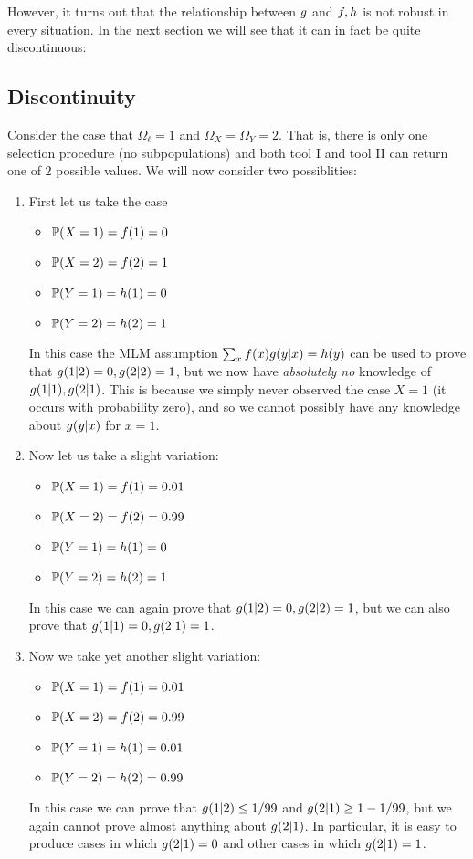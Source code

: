 However, it turns out that the relationship between $g$ and $f,h$ is not robust in every situation.  In the next section we will see that it can in fact be quite discontinuous:

\subsection{Discontinuity}

Consider the case that $\Omega_\ell = 1$ and $\Omega_X=\Omega_Y=2$.  That is, there is only one selection procedure (no subpopulations) and both tool I and tool II can return one of $2$ possible values.  We will now consider two possiblities:
\begin{enumerate}
\item First let us take the case
    \begin{itemize}
    \item $\mathbb{P}(X=1)=f(1)=0$
    \item $\mathbb{P}(X=2)=f(2)=1$
    \item $\mathbb{P}(Y=1)=h(1)=0$
    \item $\mathbb{P}(Y=2)=h(2)=1$
    \end{itemize}
    In this case the MLM assumption $\sum_x f(x)g(y|x)=h(y)$ can be used to prove that $g(1|2)=0,g(2|2)=1$, but we now have \emph{absolutely no} knowledge of $g(1|1),g(2|1)$.  This is because we simply never observed the case $X=1$ (it occurs with probability zero), and so we cannot possibly have any knowledge about $g(y|x)$ for $x=1$.  
\item Now let us take a slight variation:
    \begin{itemize}
    \item $\mathbb{P}(X=1)=f(1)=0.01$
    \item $\mathbb{P}(X=2)=f(2)=0.99$
    \item $\mathbb{P}(Y=1)=h(1)=0$
    \item $\mathbb{P}(Y=2)=h(2)=1$
    \end{itemize}
    In this case we can again prove that $g(1|2)=0,g(2|2)=1$, but we can also prove that $g(1|1)=0,g(2|1)=1$.  
\item Now we take yet another slight variation:
    \begin{itemize}
    \item $\mathbb{P}(X=1)=f(1)=0.01$
    \item $\mathbb{P}(X=2)=f(2)=0.99$
    \item $\mathbb{P}(Y=1)=h(1)=0.01$
    \item $\mathbb{P}(Y=2)=h(2)=0.99$
    \end{itemize}
    In this case we can prove that $g(1|2)\leq 1/99$ and $g(2|1)\geq 1-1/99$, but we again cannot prove almost anything about $g(2|1)$.  In particular, it is easy to produce cases in which $g(2|1)=0$ and other cases in which $g(2|1)=1$.  

\end{enumerate}

